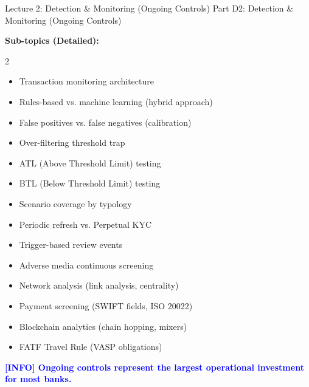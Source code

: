 \documentclass[11pt,a4paper]{beamer}
\newcommand{\bluenote}[1]{\textcolor{blue}{\textbf{[INFO] #1}}}
\begin{document}
\begin{frame}{Lecture 2: Detection \& Monitoring (Ongoing Controls)}
	\centering
	\Large Part D2: Detection \& Monitoring (Ongoing Controls)
	\vspace{0.3cm}
	
	\textbf{Sub-topics (Detailed):}
	\begin{multicols}{2}
		\begin{itemize}
			\item Transaction monitoring architecture
			\item Rules-based vs. machine learning (hybrid approach)
			\item False positives vs. false negatives (calibration)
			\item Over-filtering threshold trap
			\item ATL (Above Threshold Limit) testing
			\item BTL (Below Threshold Limit) testing
			\item Scenario coverage by typology
			\item Periodic refresh vs. Perpetual KYC
			\item Trigger-based review events
			\item Adverse media continuous screening
			\item Network analysis (link analysis, centrality)
			\item Payment screening (SWIFT fields, ISO 20022)
			\item Blockchain analytics (chain hopping, mixers)
			\item FATF Travel Rule (VASP obligations)
		\end{itemize}
	\end{multicols}
	\bluenote{Ongoing controls represent the largest operational investment for most banks.}
\end{frame}
\end{document}
